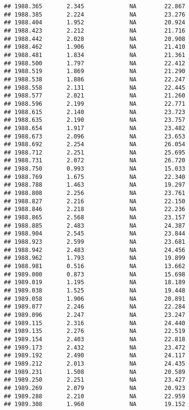\documentclass[]{book}
\begin{document}
\begin{verbatim}
## 1988.365       2.345             NA        22.867
## 1988.385       2.224             NA        23.276
## 1988.404       1.952             NA        20.924
## 1988.423       2.212             NA        21.716
## 1988.442       2.028             NA        20.908
## 1988.462       1.906             NA        21.410
## 1988.481       1.834             NA        21.361
## 1988.500       1.797             NA        22.412
## 1988.519       1.869             NA        21.290
## 1988.538       1.886             NA        22.247
## 1988.558       2.131             NA        22.445
## 1988.577       2.021             NA        21.260
## 1988.596       2.199             NA        22.771
## 1988.615       2.140             NA        23.723
## 1988.635       2.190             NA        23.757
## 1988.654       1.917             NA        23.482
## 1988.673       2.096             NA        23.653
## 1988.692       2.254             NA        26.054
## 1988.712       2.251             NA        25.695
## 1988.731       2.072             NA        26.720
## 1988.750       0.993             NA        15.033
## 1988.769       1.675             NA        22.340
## 1988.788       1.463             NA        19.297
## 1988.808       2.256             NA        23.761
## 1988.827       2.216             NA        22.150
## 1988.846       2.218             NA        22.236
## 1988.865       2.568             NA        23.157
## 1988.885       2.483             NA        24.387
## 1988.904       2.545             NA        23.844
## 1988.923       2.599             NA        23.681
## 1988.942       2.483             NA        24.456
## 1988.962       1.793             NA        19.899
## 1988.981       0.516             NA        13.662
## 1989.000       0.873             NA        15.698
## 1989.019       1.195             NA        18.189
## 1989.038       1.525             NA        19.448
## 1989.058       1.906             NA        20.891
## 1989.077       2.246             NA        22.284
## 1989.096       2.247             NA        23.247
## 1989.115       2.316             NA        24.440
## 1989.135       2.276             NA        22.519
## 1989.154       2.403             NA        22.818
## 1989.173       2.432             NA        23.472
## 1989.192       2.490             NA        24.117
## 1989.212       2.013             NA        24.435
## 1989.231       1.508             NA        20.589
## 1989.250       2.251             NA        23.427
## 1989.269       2.079             NA        20.923
## 1989.288       2.210             NA        22.959
## 1989.308       1.960             NA        19.152

\end{verbatim}
\end{document}
